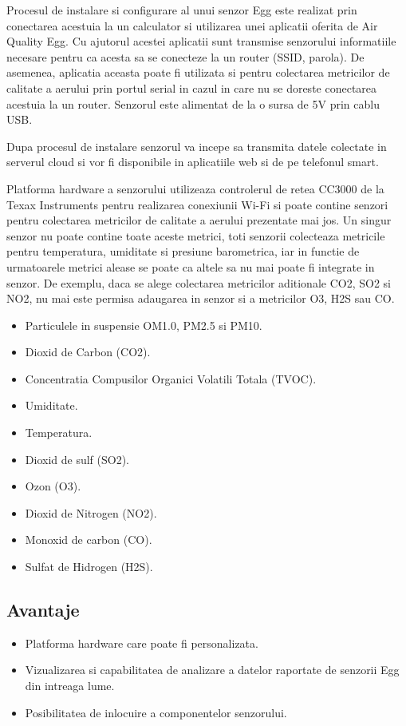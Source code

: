 Procesul de instalare si configurare al unui senzor Egg este realizat prin conectarea acestuia la un calculator si utilizarea unei aplicatii oferita de Air 
Quality Egg. Cu ajutorul acestei aplicatii sunt transmise senzorului informatiile necesare pentru ca acesta sa se conecteze la un router (SSID, parola). De 
asemenea, aplicatia aceasta poate fi utilizata si pentru colectarea metricilor de calitate a aerului prin portul serial in cazul in care nu se doreste conectarea 
acestuia la un router. Senzorul este alimentat de la o sursa de 5V prin cablu USB.

Dupa procesul de instalare senzorul va incepe sa transmita datele colectate in serverul cloud si vor fi disponibile in aplicatiile web si de pe telefonul smart.

Platforma hardware a senzorului utilizeaza controlerul de retea CC3000 de la Texax Instruments pentru realizarea conexiunii Wi-Fi si poate contine senzori pentru 
colectarea metricilor de calitate a aerului prezentate mai jos. Un singur senzor nu poate contine toate aceste metrici, toti senzorii colecteaza metricile pentru 
temperatura, umiditate si presiune barometrica, iar in functie de urmatoarele metrici alease se poate ca altele sa nu mai poate fi integrate in senzor. De exemplu, 
daca se alege colectarea metricilor aditionale CO2, SO2 si NO2, nu mai este permisa adaugarea in senzor si a metricilor O3, H2S sau CO.
\begin{itemize}
	\item Particulele in suspensie OM1.0, PM2.5 si PM10.
	\item Dioxid de Carbon (CO2).
	\item Concentratia Compusilor Organici Volatili Totala (TVOC).
	\item Umiditate.
	\item Temperatura.
	\item Dioxid de sulf (SO2). 
	\item Ozon (O3).
	\item Dioxid de Nitrogen (NO2).
	\item Monoxid de carbon (CO).
	\item Sulfat de Hidrogen (H2S).
\end{itemize}

\subsection{Avantaje}\label{subsec:airqualityegg_avantaje}
\begin{itemize}
	\item Platforma hardware care poate fi personalizata.
	\item Vizualizarea si capabilitatea de analizare a datelor raportate de senzorii Egg din intreaga lume.
	\item Posibilitatea de inlocuire a componentelor senzorului.
\end{itemize}

